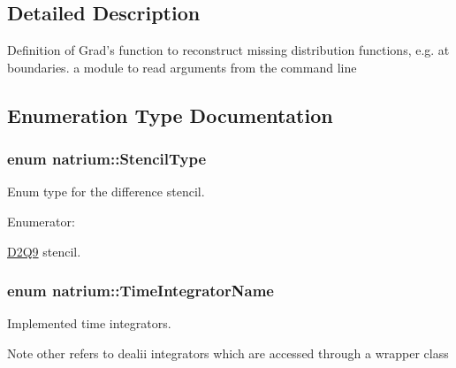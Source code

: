 \subsection{Detailed Description}
Definition of Grad's function to reconstruct missing distribution functions, e.g. at boundaries. a module to read arguments from the command line 

\subsection{Enumeration Type Documentation}
\hypertarget{namespacenatrium_a45d5dacaf5eb5efde670179d949173ba}{
\subsubsection[{StencilType}]{\setlength{\rightskip}{0pt plus 5cm}enum {\bf natrium::StencilType}}}
\label{namespacenatrium_a45d5dacaf5eb5efde670179d949173ba}


Enum type for the difference stencil. \begin{Desc}
\item[Enumerator: ]\par
\begin{description}
\item[{\em 
\hypertarget{namespacenatrium_a45d5dacaf5eb5efde670179d949173baabe9c0ce3734a5131262789758ca5fbd1}{
Stencil\_\-D2Q9}
\label{namespacenatrium_a45d5dacaf5eb5efde670179d949173baabe9c0ce3734a5131262789758ca5fbd1}
}]\hyperlink{classnatrium_1_1D2Q9}{D2Q9} stencil. \end{description}
\end{Desc}

\hypertarget{namespacenatrium_a00a0ec1e80f138680e0fcca78349f6d8}{
\subsubsection[{TimeIntegratorName}]{\setlength{\rightskip}{0pt plus 5cm}enum {\bf natrium::TimeIntegratorName}}}
\label{namespacenatrium_a00a0ec1e80f138680e0fcca78349f6d8}


Implemented time integrators. \begin{DoxyNote}{Note}
other refers to dealii integrators which are accessed through a wrapper class 
\end{DoxyNote}


